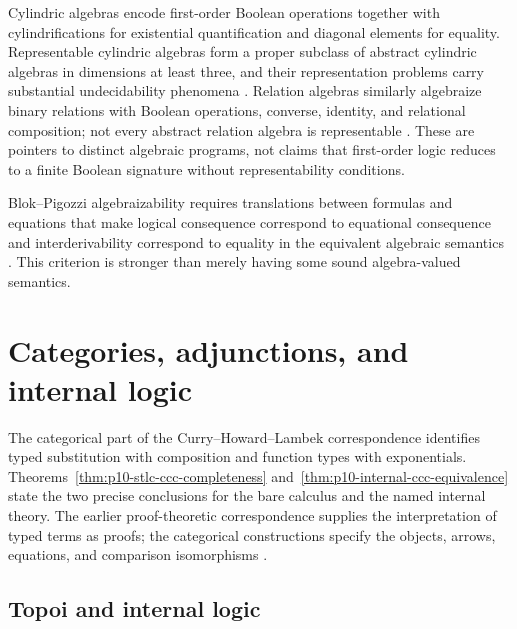 Cylindric algebras encode first-order Boolean operations together with
cylindrifications for existential quantification and diagonal elements for
equality. Representable cylindric algebras form a proper subclass of abstract
cylindric algebras in dimensions at least three, and their representation
problems carry substantial undecidability phenomena
\cite{HenkinMonkTarski1971}. Relation algebras similarly algebraize binary
relations with Boolean operations, converse, identity, and relational
composition; not every abstract relation algebra is representable
\cite{Tarski1935,Maddux2006}. These are pointers to distinct algebraic
programs, not claims that first-order logic reduces to a finite Boolean
signature without representability conditions.

Blok--Pigozzi algebraizability requires translations between formulas and
equations that make logical consequence correspond to equational consequence
and interderivability correspond to equality in the equivalent algebraic
semantics \cite{BlokPigozzi1989}. This criterion is stronger than merely having
some sound algebra-valued semantics.

\section{Categories, adjunctions, and internal logic}
\label{sec:p10-categorical-logic}





The categorical part of the Curry--Howard--Lambek correspondence
identifies typed substitution with composition and function types with
exponentials.  Theorems~\ref{thm:p10-stlc-ccc-completeness}
and~\ref{thm:p10-internal-ccc-equivalence} state the two precise
conclusions for the bare calculus and the named internal theory.
The earlier proof-theoretic correspondence supplies the interpretation
of typed terms as proofs; the categorical constructions specify the
objects, arrows, equations, and comparison isomorphisms
\cite{Lambek1980,LambekScott1986}.










\subsection{Topoi and internal logic}

